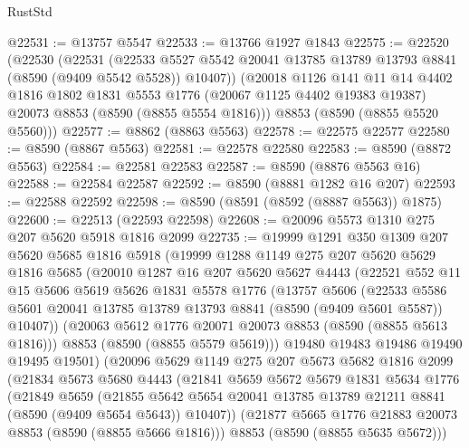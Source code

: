 \begin{lexlean}{RustStd}
\begin{coremodule}
@22531 := @13757 @5547
@22533 := @13766 @1927 @1843
@22575 := @22520
    (@22530
      (@22531
        (@22533 @5527 @5542 @20041 @13785 @13789 @13793 @8841 (@8590 (@9409 @5542 @5528)) @10407))
      (@20018
        @1126
        @141
        @11
        @14
        @4402
        @1816
        @1802
        @1831
        @5553
        @1776
        (@20067 @1125 @4402 @19383 @19387)
        @20073
        @8853
        (@8590 (@8855 @5554 @1816)))
      @8853
      (@8590 (@8855 @5520 @5560)))
@22577 := @8862 (@8863 @5563)
@22578 := @22575 @22577
@22580 := @8590 (@8867 @5563)
@22581 := @22578 @22580
@22583 := @8590 (@8872 @5563)
@22584 := @22581 @22583
@22587 := @8590 (@8876 @5563 @16)
@22588 := @22584 @22587
@22592 := @8590 (@8881 @1282 @16 @207)
@22593 := @22588 @22592
@22598 := @8590 (@8591 (@8592 (@8887 @5563)) @1875)
@22600 := @22513 (@22593 @22598)
@22608 := @20096 @5573 @1310 @275 @207 @5620 @5918 @1816 @2099
@22735 := @19999
    @1291
    @350
    @1309
    @207
    @5620
    @5685
    @1816
    @5918
    (@19999
      @1288
      @1149
      @275
      @207
      @5620
      @5629
      @1816
      @5685
      (@20010
        @1287
        @16
        @207
        @5620
        @5627
        @4443
        (@22521
          @552
          @11
          @15
          @5606
          @5619
          @5626
          @1831
          @5578
          @1776
          (@13757
            @5606
            (@22533
              @5586
              @5601
              @20041
              @13785
              @13789
              @13793
              @8841
              (@8590 (@9409 @5601 @5587))
              @10407))
          (@20063 @5612 @1776 @20071 @20073 @8853 (@8590 (@8855 @5613 @1816)))
          @8853
          (@8590 (@8855 @5579 @5619)))
        @19480
        @19483
        @19486
        @19490
        @19495
        @19501)
      (@20096
        @5629
        @1149
        @275
        @207
        @5673
        @5682
        @1816
        @2099
        (@21834
          @5673
          @5680
          @4443
          (@21841
            @5659
            @5672
            @5679
            @1831
            @5634
            @1776
            (@21849
              @5659
              (@21855
                @5642
                @5654
                @20041
                @13785
                @13789
                @21211
                @8841
                (@8590 (@9409 @5654 @5643))
                @10407))
            (@21877 @5665 @1776 @21883 @20073 @8853 (@8590 (@8855 @5666 @1816)))
            @8853
            (@8590 (@8855 @5635 @5672)))

\end{coremodule}
\end{lexlean}
